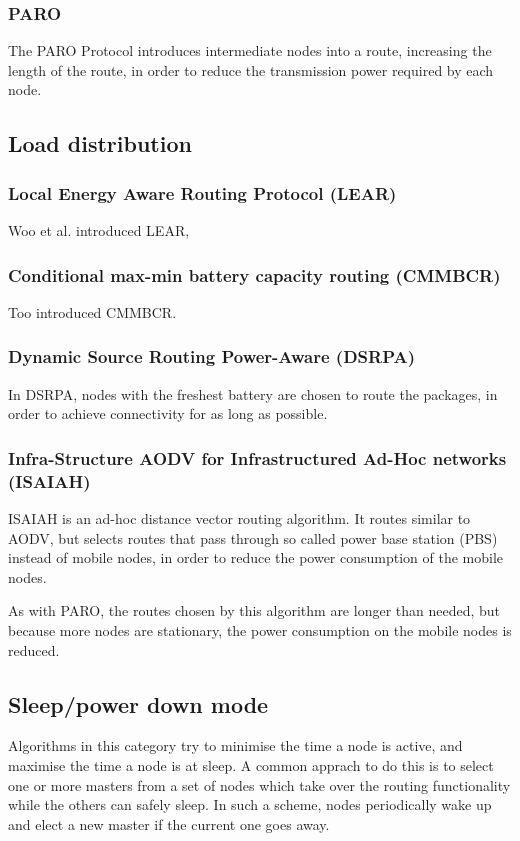 \documentclass[conference]{IEEEtran}
\begin{document}
\subsubsection{PARO}
The PARO Protocol\cite{gomez2003paro} introduces intermediate nodes into a
route, increasing the length of the route, in order to reduce the transmission
power required by each node.

\subsection{Load distribution}
\subsubsection{Local Energy Aware Routing Protocol (LEAR)}
Woo et al. introduced LEAR\cite{woo2001non},

\subsubsection{Conditional max-min battery capacity routing (CMMBCR)}
Too introduced CMMBCR\cite{toh2001maximum}.

\subsubsection{Dynamic Source Routing Power-Aware (DSRPA)}
In DSRPA\cite{djenouri2006dynamic}, nodes with the freshest battery are
chosen to route the packages, in order to achieve connectivity for as
long as possible.\cite{alotaibi2012survey}

\subsubsection{Infra-Structure AODV for Infrastructured Ad-Hoc networks (ISAIAH)}
ISAIAH\cite{lindgren2002infrastructured} is an ad-hoc distance vector routing
algorithm. It routes similar to AODV, but selects routes that pass through
so called power base station (PBS) instead of mobile nodes, in order to reduce
the power consumption of the mobile nodes.

As with PARO, the routes chosen by this algorithm are longer than needed, but
because more nodes are stationary, the power consumption on the mobile nodes
is reduced.

\subsection{Sleep/power­ down mode}
Algorithms in this category try to minimise the time a node is active, and
maximise the time a node is at sleep. A common apprach to do this is to select
one or more masters from a set of nodes which take over the routing functionality
while the others can safely sleep. In such a scheme, nodes periodically wake up
and elect a new master if the current one goes away.
\end{document}
